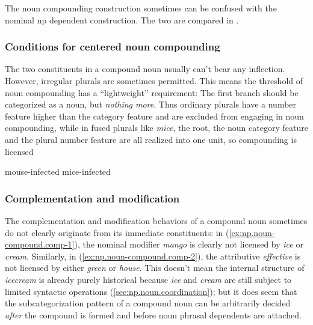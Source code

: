 \documentclass[UTF8, a4paper, oneside, scheme=plain, 12pt]{ctexbook}
\newcommand*{\citesec}[1]{\S~{#1}}
\newcommand{\form}[1]{\emph{#1}}
\begin{document}
The noun compounding construction 
sometimes can be confused with the nominal \acs{np} dependent construction. 
The two are compared in .

\subsubsection{Conditions for centered noun compounding}

The two constituents in a compound noun usually can't bear any inflection.
However, irregular plurals are sometimes permitted.
This means the threshold of noun compounding has a ``lightweight'' requirement:
The first branch should be categorized as a noun,
but \emph{nothing more}.
Thus ordinary plurals have a number feature higher than the category feature 
and are excluded from engaging in noun compounding,
while in fused plurals like \form{mice},
the root, the noun category feature and the plural number feature 
are all realized into one unit,
so compounding is licensed \citep[\citesec{7.1}]{siddiqi2009syntax}

\begin{exe}
    \ex \begin{xlist}
        \ex mouse-infected
        \ex mice-infected
    \end{xlist}
\end{exe}

\subsubsection{Complementation and modification}\label{sec:np.noun-compound.license}

The complementation and modification behaviors of a compound noun 
sometimes do not clearly originate 
from its immediate constituents: 
in (\ref{ex:np.noun-compound.comp-1}), 
the nominal modifier \form{mango} 
is clearly not licensed by \form{ice} or \form{cream}. 
Similarly, in (\ref{ex:np.noun-compound.comp-2}), 
the attributive \form{effective} is not licensed by either \form{green} or \form{house}. 
This doesn't mean the internal structure of \form{icecream} is already purely historical 
because \form{ice} and \form{cream} are still subject to limited syntactic operations 
(\ref{sec:np.noun.coordination}); 
but it does seem that the subcategorization pattern of 
a compound noun can be arbitrarily decided 
\emph{after} the compound is formed
and before noun phrasal dependents are attached.
\end{document}
